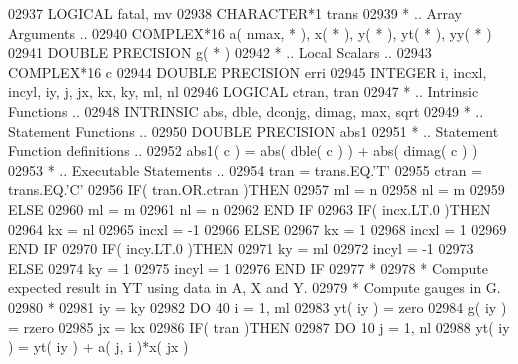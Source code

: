 \begin{DoxyCode}
02937       \textcolor{keywordtype}{LOGICAL}            fatal, mv
02938       \textcolor{keywordtype}{CHARACTER*1}        trans
02939 \textcolor{comment}{*     .. Array Arguments ..}
02940       \textcolor{keywordtype}{COMPLEX*16}         a( nmax, * ), x( * ), y( * ), yt( * ), yy( * )
02941       \textcolor{keywordtype}{DOUBLE PRECISION}   g( * )
02942 \textcolor{comment}{*     .. Local Scalars ..}
02943       \textcolor{keywordtype}{COMPLEX*16}         c
02944       \textcolor{keywordtype}{DOUBLE PRECISION}   erri
02945       \textcolor{keywordtype}{INTEGER}            i, incxl, incyl, iy, j, jx, kx, ky, ml, nl
02946       \textcolor{keywordtype}{LOGICAL}            ctran, tran
02947 \textcolor{comment}{*     .. Intrinsic Functions ..}
02948       \textcolor{keywordtype}{INTRINSIC}          abs, dble, dconjg, dimag, max, sqrt
02949 \textcolor{comment}{*     .. Statement Functions ..}
02950       \textcolor{keywordtype}{DOUBLE PRECISION}   abs1
02951 \textcolor{comment}{*     .. Statement Function definitions ..}
02952       abs1( c ) = abs( dble( c ) ) + abs( dimag( c ) )
02953 \textcolor{comment}{*     .. Executable Statements ..}
02954       tran = trans.EQ.\textcolor{stringliteral}{'T'}
02955       ctran = trans.EQ.\textcolor{stringliteral}{'C'}
02956       \textcolor{keywordflow}{IF}( tran.OR.ctran )\textcolor{keywordflow}{THEN}
02957          ml = n
02958          nl = m
02959       \textcolor{keywordflow}{ELSE}
02960          ml = m
02961          nl = n
02962 \textcolor{keywordflow}{      END IF}
02963       \textcolor{keywordflow}{IF}( incx.LT.0 )\textcolor{keywordflow}{THEN}
02964          kx = nl
02965          incxl = -1
02966       \textcolor{keywordflow}{ELSE}
02967          kx = 1
02968          incxl = 1
02969 \textcolor{keywordflow}{      END IF}
02970       \textcolor{keywordflow}{IF}( incy.LT.0 )\textcolor{keywordflow}{THEN}
02971          ky = ml
02972          incyl = -1
02973       \textcolor{keywordflow}{ELSE}
02974          ky = 1
02975          incyl = 1
02976 \textcolor{keywordflow}{      END IF}
02977 \textcolor{comment}{*}
02978 \textcolor{comment}{*     Compute expected result in YT using data in A, X and Y.}
02979 \textcolor{comment}{*     Compute gauges in G.}
02980 \textcolor{comment}{*}
02981       iy = ky
02982       \textcolor{keywordflow}{DO} 40 i = 1, ml
02983          yt( iy ) = zero
02984          g( iy ) = rzero
02985          jx = kx
02986          \textcolor{keywordflow}{IF}( tran )\textcolor{keywordflow}{THEN}
02987             \textcolor{keywordflow}{DO} 10 j = 1, nl
02988                yt( iy ) = yt( iy ) + a( j, i )*x( jx )

\end{DoxyCode}
